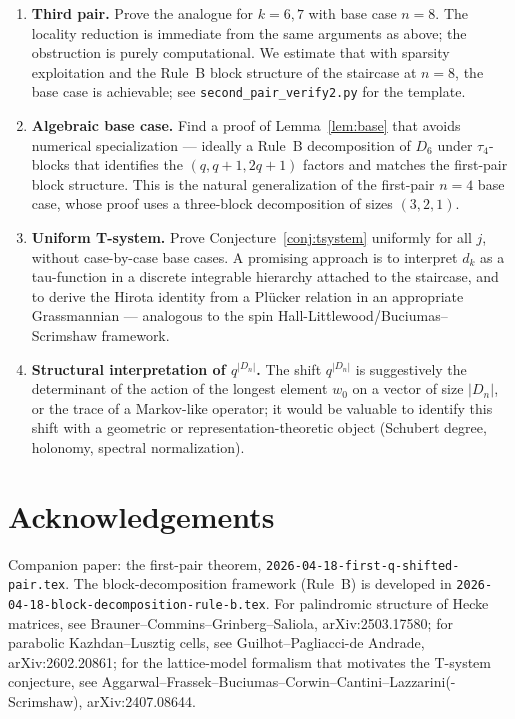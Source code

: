 \documentclass[11pt]{article}
\theoremstyle{definition}
\begin{document}
\begin{enumerate}
\item \textbf{Third pair.} Prove the analogue for $k = 6, 7$ with base case
$n = 8$. The locality reduction is immediate from the same arguments as
above; the obstruction is purely computational. We estimate that with
sparsity exploitation and the Rule~B block structure of the staircase at $n=8$,
the base case is achievable; see \texttt{second\_pair\_verify2.py} for the
template.

\item \textbf{Algebraic base case.} Find a proof of Lemma~\ref{lem:base}
that avoids numerical specialization --- ideally a Rule~B decomposition of
$D_6$ under $\tau_4$-blocks that identifies the $(q, q+1, 2q+1)$ factors and
matches the first-pair block structure. This is the natural generalization
of the first-pair $n=4$ base case, whose proof uses a three-block
decomposition of sizes $(3, 2, 1)$.

\item \textbf{Uniform T-system.} Prove Conjecture~\ref{conj:tsystem}
uniformly for all $j$, without case-by-case base cases. A promising approach
is to interpret $d_k$ as a tau-function in a discrete integrable hierarchy
attached to the staircase, and to derive the Hirota identity from a
Pl\"ucker relation in an appropriate Grassmannian --- analogous to the
spin Hall-Littlewood/Buciumas--Scrimshaw framework.

\item \textbf{Structural interpretation of $q^{|D_n|}$.} The shift $q^{|D_n|}$
is suggestively the determinant of the action of the longest element $w_0$ on
a vector of size $|D_n|$, or the trace of a Markov-like operator; it would
be valuable to identify this shift with a geometric or representation-theoretic
object (Schubert degree, holonomy, spectral normalization).
\end{enumerate}

\section*{Acknowledgements}

Companion paper: the first-pair theorem, \texttt{2026-04-18-first-q-shifted-pair.tex}.
The block-decomposition framework (Rule~B) is developed in
\texttt{2026-04-18-block-decomposition-rule-b.tex}. For palindromic structure of
Hecke matrices, see Brauner--Commins--Grinberg--Saliola, arXiv:2503.17580;
for parabolic Kazhdan--Lusztig cells, see Guilhot--Pagliacci-de Andrade,
arXiv:2602.20861; for the lattice-model formalism that motivates the T-system
conjecture, see Aggarwal--Frassek--Buciumas--Corwin--Cantini--Lazzarini(-Scrimshaw),
arXiv:2407.08644.
\end{document}

